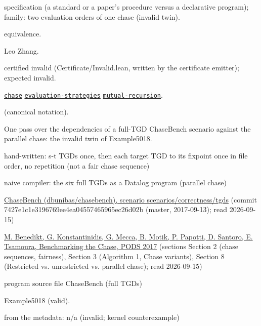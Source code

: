 \documentclass[10pt]{article}
\begin{document}
\begin{description}[leftmargin=2.6cm,style=nextline,itemsep=1pt]

\item[Category] specification (a standard or a paper's procedure versus a declarative program); family: two evaluation orders of one chase (invalid twin).

\item[Kind] equivalence.

\item[Contributors] Leo Zhang.

\item[Status] certified invalid (Certificate/Invalid.lean, written by the certificate emitter); expected invalid.

\item[Tags] \hyperref[tag:chase]{\texttt{chase}} \hyperref[tag:evaluation-strategies]{\texttt{evaluation-strategies}} \hyperref[tag:mutual-recursion]{\texttt{mutual-recursion}}.

\item[Input]  (canonical notation).

\item[Summary] One pass over the dependencies of a full-TGD ChaseBench scenario against the parallel chase: the invalid twin of Example5018.

\item[Sides] hand-written: s-t TGDs once, then each target TGD to its fixpoint once in file order, no repetition (not a fair chase sequence) \par naive compiler: the six full TGDs as a Datalog program (parallel chase)

\item[Sources] {\raggedright \href{https://github.com/dbunibas/chasebench}{ChaseBench (dbunibas/chasebench), scenario scenarios/correctness/tgds} (commit 7427e1c1e3196769ee4ea04557465965ec26d02b (master, 2017-09-13); read 2026-09-15) \par \href{https://doi.org/10.1145/3034786.3034796}{M. Benedikt, G. Konstantinidis, G. Mecca, B. Motik, P. Papotti, D. Santoro, E. Tsamoura, Benchmarking the Chase, PODS 2017} (sections Section 2 (chase sequences, fairness), Section 3 (Algorithm 1, Chase variants), Section 8 (Restricted vs. unrestricted vs. parallel chase); read 2026-09-15) \par program source file ChaseBench  (full TGDs)\par}

\item[Twin] Example5018 (valid).

\item[Obstruction note] from the metadata: n/a (invalid; kernel counterexample)

\end{description}
\end{document}
